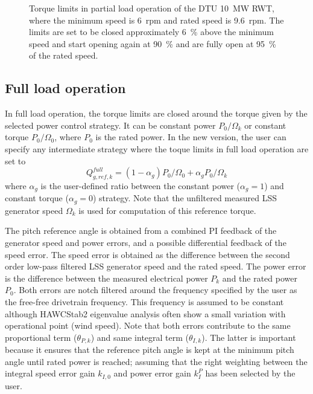 \begin{figure}[t]
\centerline{
 }
\caption{Torque limits in partial load operation of the DTU 10~MW RWT, where the minimum speed is 6~rpm and rated speed is 9.6~rpm. The limits are set to be closed approximately 6~\% above the minimum speed and start opening again at 90~\% and are fully open at 95~\% of the rated speed. \label{f:torque_limits}}
\end{figure}

\subsection{Full load operation}

In full load operation, the torque limits are closed around the torque given by the selected power control strategy. It can be constant power $P_0/\Omega_k$ or constant torque $P_0/\Omega_0$, where $P_0$ is the rated power. In the new version, the user can specify any intermediate strategy where the toque limits in full load operation are set to
\begin{equation}
Q_{g,ref,k}^{full} = \left(1-\alpha_g \right) P_0/\Omega_0 +  \alpha_g P_0/\Omega_k
\end{equation}
where $\alpha_g$ is the user-defined ratio between the constant power ($\alpha_g = 1$) and constant torque ($\alpha_g = 0$) strategy. Note that the unfiltered measured LSS generator speed $\Omega_k$ is used for computation of this reference torque.

The pitch reference angle is obtained from a combined PI feedback of the generator speed and power errors, and a possible differential feedback of the speed error. The speed error is obtained as the difference between the second order low-pass filtered LSS generator speed and the rated speed. The power error is the difference between the measured electrical power $P_k$ and the rated power $P_0$. Both errors are notch filtered around the frequency specified by the user as the free-free drivetrain frequency. This frequency is assumed to be constant although HAWCStab2 eigenvalue analysis often show a small variation with operational point (wind speed). Note that both errors contribute to the same proportional term ($\theta_{P,k}$) and same integral term ($\theta_{I,k}$). The latter is important because it ensures that the reference pitch angle is kept at the minimum pitch angle until rated power is reached; assuming that the right weighting between the integral speed error gain $k_{I,0}$ and power error gain $k_I^P$ has been selected by the user.

